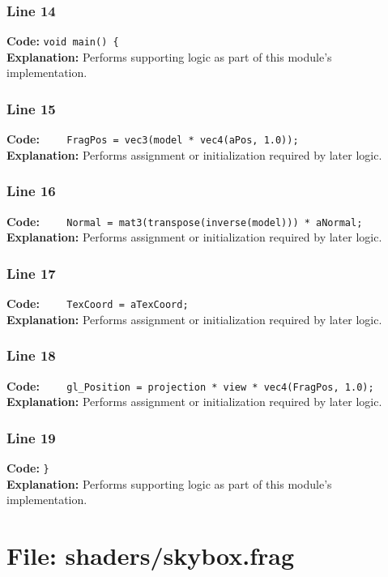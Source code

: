 \documentclass[11pt,a4paper]{article}
\begin{document}
\subsubsection*{Line 14}
\textbf{Code:} \verb|void main() {|\\
\textbf{Explanation:} Performs supporting logic as part of this module's implementation.

\subsubsection*{Line 15}
\textbf{Code:} \verb|    FragPos = vec3(model * vec4(aPos, 1.0));|\\
\textbf{Explanation:} Performs assignment or initialization required by later logic.

\subsubsection*{Line 16}
\textbf{Code:} \verb|    Normal = mat3(transpose(inverse(model))) * aNormal;|\\
\textbf{Explanation:} Performs assignment or initialization required by later logic.

\subsubsection*{Line 17}
\textbf{Code:} \verb|    TexCoord = aTexCoord;|\\
\textbf{Explanation:} Performs assignment or initialization required by later logic.

\subsubsection*{Line 18}
\textbf{Code:} \verb|    gl_Position = projection * view * vec4(FragPos, 1.0);|\\
\textbf{Explanation:} Performs assignment or initialization required by later logic.

\subsubsection*{Line 19}
\textbf{Code:} \verb|}|\\
\textbf{Explanation:} Performs supporting logic as part of this module's implementation.

\newpage
\section{File: shaders/skybox.frag}
\end{document}

